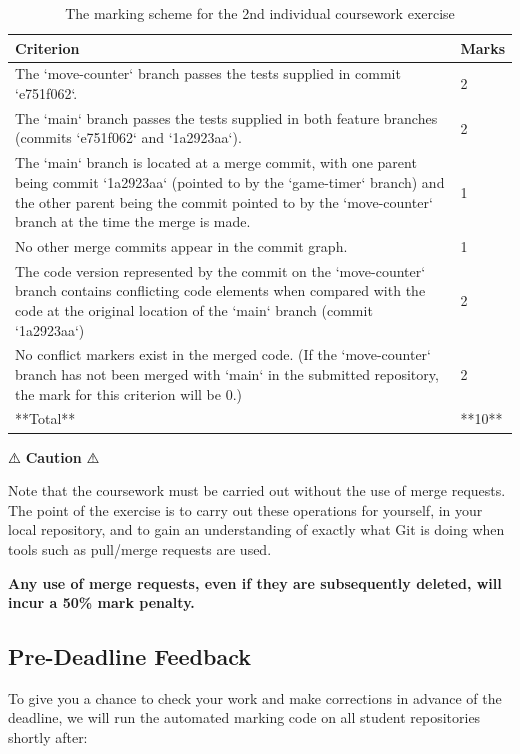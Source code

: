 \documentclass[
]{book}
\begin{document}
\begin{table}

\caption{\label{tab:marktable2}The marking scheme for the 2nd individual coursework exercise}
\centering
\begin{tabular}[t]{ll}
\toprule
Criterion & Marks\\
\midrule
The `move-counter` branch passes the tests supplied in commit `e751f062`. & 2\\
The `main` branch passes the tests supplied in both feature branches (commits `e751f062` and `1a2923aa`). & 2\\
The `main` branch is located at a merge commit, with one parent being commit `1a2923aa` (pointed to by the `game-timer` branch) and the other parent being the commit pointed to by the `move-counter` branch at the time the merge is made. & 1\\
No other merge commits appear in the commit graph. & 1\\
The code version represented by the commit on the `move-counter` branch contains conflicting code elements when compared with the code at the original location of the `main` branch (commit `1a2923aa`) & 2\\
\addlinespace
No conflict markers exist in the merged code.  (If the `move-counter` branch has not been merged with `main` in the submitted repository, the mark for this criterion will be 0.) & 2\\
**Total** & **10**\\
\bottomrule
\end{tabular}
\end{table}

⚠️ \textbf{Caution} ⚠️

Note that the coursework must be carried out without the use of merge requests. The point of the exercise is to carry out these operations for yourself, in your local repository, and to gain an understanding of exactly what Git is doing when tools such as pull/merge requests are used.

\textbf{Any use of merge requests, even if they are subsequently deleted, will incur a 50\% mark penalty.}

\hypertarget{predead}{%
\subsection{Pre-Deadline Feedback}\label{predead}}

To give you a chance to check your work and make corrections in advance of the deadline, we will run the automated marking code on all student repositories shortly after:
\end{document}
